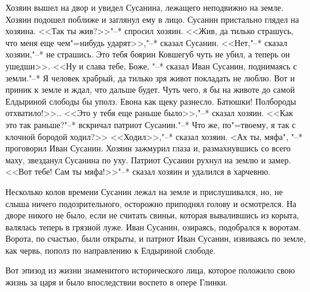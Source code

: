 Хозяин вышел на двор и увидел  Сусанина, лежащего неподвижно на земле. Хозяин подошел поближе  и заглянул ему в лицо. Сусанин пристально глядел на хозяина.  <<Так ты жив?>>"--* спросил  хозяин. <<Жив, да тилько страшусь, что  меня еще чем"=нибудь ударят>>,"--*  сказал Сусанин. <<Нет,"--* сказал хозяин,"--*  не  страшись. Это тебя боярин Ковшегуб чуть не убил, а теперь он ушедши>>. <<Ну и слава тебе, Боже, "--* сказал Иван Сусанин, поднимаясь с земли."--* Я человек храбрый, да тилько  зря  живот покладать  не  люблю.  Вот и приник к земле  и ждал, что дальше будет. Чуть чего,  я бы  на животе до самой Елдыриной слободы бы  уполз. Евона как щеку разнесло. Батюшки!  Полбороды отхватило!>>.. <<Это у тебя еще раньше было>>,"--* сказал хозяин. <<Как это так раньше?"--* вскричал патриот Сусанин."--* Что же,  по"=твоему, я так с клочной бородой ходил?>> <<Ходил>>,"--* сказал хозяин. <Ах ты, мяфа", "--* проговорил Иван Сусанин. Хозяин зажмурил глаза и, размахнувшись  со  всего  маху, звезданул Сусанина по уху. Патриот Сусанин рухнул  на  землю и замер. <<Вот тебе! Сам ты мяфа!>>"--* сказал хозяин и удалился в харчевню.
    
Несколько колов времени Сусанин лежал на земле и прислушивался, но, не слыша ничего подозрительного, осторожно приподнял голову и осмотрелся. На дворе никого не  было, если не считать  свиньи, которая вывалившись из корыта, валялась теперь в грязной луже. Иван Сусанин, озираясь, подобрался к воротам. Ворота, по счастью, были открыты, и патриот Иван Сусанин, извиваясь по земле, как червь, пополз по направлению к Елдыриной слободе.
    
Вот эпизод из жизни знаменитого исторического лица, которое положило свою жизнь за царя и было впоследствии воспето в опере Глинки.
